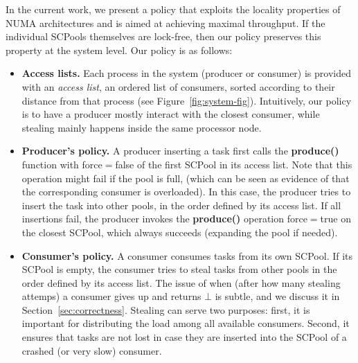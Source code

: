 In the current work, we present a policy that exploits the locality properties of NUMA architectures and is aimed at achieving maximal throughput. If the individual SCPools themselves are lock-free, then our policy preserves this property at the system level. Our policy is as follows:
\begin{itemize}
	\item {\bf Access lists.} Each process in the system (producer or consumer) is provided with an \emph{access list}, an ordered list of consumers, sorted according to their distance from that process (see Figure~\ref{fig:system-fig}). Intuitively, our policy is to have a producer mostly interact with the closest consumer, while stealing mainly happens inside the same processor node. 
	\item {\bf Producer's policy.} A producer inserting a task first calls the {\bf produce()} function with force$=$false of the first SCPool in its access list. Note that this operation might fail if the pool is full, (which can be seen as evidence of that the corresponding consumer is overloaded).  In this case, the producer tries to insert the task into other pools, in the order defined by its access list. If all insertions fail, the producer invokes the {\bf produce()} operation force$=$true on the closest SCPool, which always succeeds (expanding the pool if needed). 
	\item {\bf Consumer's policy.} A consumer consumes tasks from its own SCPool. If its SCPool is empty, the consumer tries to steal tasks from other pools in the order defined by its access list. The issue of when (after how many stealing attemps) a consumer gives up and returns $\bot$ is subtle, and we discuss it in Section~\ref{sec:correctness}. Stealing can serve two purposes: first, it is important for distributing the load among all available consumers. Second, it ensures that tasks are not lost in case they are inserted into  the SCPool of a crashed (or  very slow) consumer.
\end{itemize}





